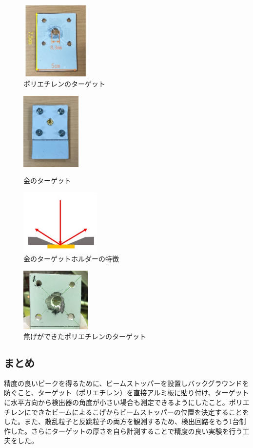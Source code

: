 \documentclass[a4paper,11pt,dvipdfmx]{jsarticle}
\begin{document}
　 \begin{figure}[H]
    \centering
    \includegraphics[width=35mm]{picture/setup/poli.jpg}
    \caption{ポリエチレンのターゲット}
    \label{poli}
  \end{figure}
  
  \begin{figure}[H]
    \begin{minipage}{0.5\hsize}
     \begin{center}
      \includegraphics[width=30mm]{picture/setup/gold.jpg}
     \end{center}
     \caption{金のターゲット}
     \label{gold}
    \end{minipage}
    \begin{minipage}{0.5\hsize}
     \begin{center}
      \includegraphics[width=40mm]{picture/setup/goldtokutyou.png}
     \end{center}
     \caption{金のターゲットホルダーの特徴}
     \label{goldtokutyou}
    \end{minipage}
  \end{figure}
  
  \begin{figure}[H]
    \centering
    \includegraphics[width=35mm]{picture/setup/koge.jpg}
    \caption{焦げができたポリエチレンのターゲット}
    \label{koge}
  \end{figure}

\subsection{まとめ}
精度の良いピークを得るために、ビームストッパーを設置しバックグラウンドを防ぐこと、ターゲット（ポリエチレン）を直接アルミ板に貼り付け、ターゲットに水平方向から検出器の角度が小さい場合も測定できるようにしたこと。ポリエチレンにできたビームによるこげからビームストッパーの位置を決定することをした。また、散乱粒子と反跳粒子の両方を観測するため、検出回路をもう1台制作した。さらにターゲットの厚さを自ら計測することで精度の良い実験を行う工夫をした。
\end{document}
